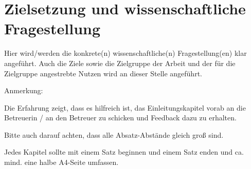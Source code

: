 \section{Zielsetzung und wissenschaftliche Fragestellung}\label{sec:researchQuestion}

Hier wird/werden die konkrete(n) wissenschaftliche(n) Fragestellung(en) klar angeführt. Auch die Ziele sowie die Zielgruppe der Arbeit und der für die Zielgruppe angestrebte Nutzen wird an dieser Stelle angeführt.

Anmerkung:

Die Erfahrung zeigt, dass es hilfreich ist, das Einleitungskapitel vorab an die Betreuerin / an den Betreuer zu schicken und Feedback dazu zu erhalten.

Bitte auch darauf achten, dass alle Absatz-Abstände gleich groß sind.

Jedes Kapitel sollte mit einem Satz beginnen und einem Satz enden und ca. mind. eine halbe A4-Seite umfassen.
